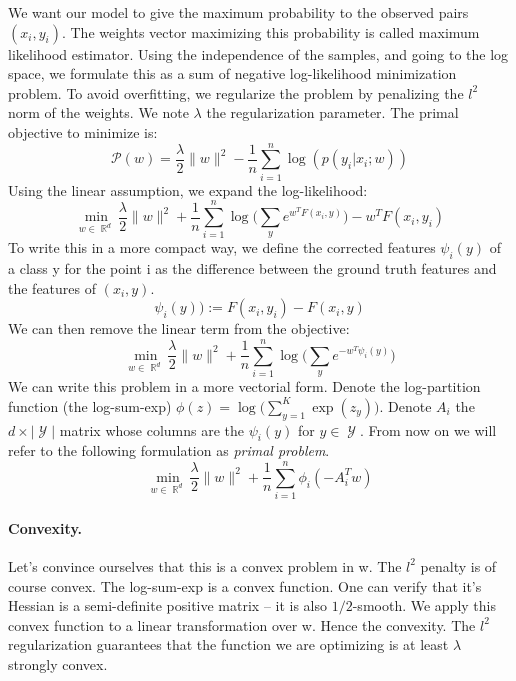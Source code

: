 \documentclass{article}
\DeclareMathOperator{\R}{\mathbb{R}}
\DeclareMathOperator{\1}{\mathbb{1}}
\DeclareMathOperator{\Y}{\mathcal{Y}}
\begin{document}
We want our model to give the maximum probability to the observed pairs $(x_i, y_i)$.
The weights vector maximizing this probability is called maximum likelihood estimator.
Using the independence of the samples, and going to the log space, we formulate this as a sum of negative log-likelihood minimization problem.
To avoid overfitting, we regularize the problem by penalizing the $l^2$ norm of the weights.
We note $\lambda$ the regularization parameter. The primal objective to minimize is:
\begin{equation*}
\mathscr P(w) = \frac{\lambda}{2}\|w\|^2 - \frac{1}{n}   \sum_{i=1}^{n} \log(p(y_i|x_i; w))	
\end{equation*}
Using the linear assumption, we expand the log-likelihood:
\begin{equation*}
	\min_{w\in\R^d} \frac{\lambda}{2}\|w\|^2 + \frac{1}{n}   \sum_{i=1}^{n}  \log \big (\sum_y e^{w^TF(x_i, y)} \big ) - w^TF(x_i, y_i)	
\end{equation*}
To write this in a more compact way, we define the corrected features $\psi_i(y)$ of a class y for the point i as the difference between the ground truth features and the features of $(x_i, y)$.
\begin{equation*}
	\psi_i(y)) := F(x_i, y_i) - F(x_i, y)
\end{equation*}
We can then remove the linear term from the objective:
\begin{equation*}
	\min_{w\in\R^d} \frac{\lambda}{2}\|w\|^2 + \frac{1}{n}   \sum_{i=1}^{n}  \log \big (\sum_y e^{- w^T\psi_i(y)} \big )
\end{equation*}
We can write this problem in a more vectorial form.
Denote the log-partition function (the log-sum-exp) $\phi(z) = \log \big(\sum_{y=1}^K \exp(z_y)\big)$. 
Denote $A_i$ the $d \times |\Y|$ matrix whose columns are the $\psi_i(y)$ for $y \in \Y$.
From now on we will refer to the following formulation as \textit{primal problem}.
\begin{equation}
	\label{primal problem}
	\min_{w\in\R^d}  \frac{\lambda}{2}\|w\|^2 + \frac{1}{n}   \sum_{i=1}^{n} \phi_i(-A_i^Tw)
\end{equation} 

\paragraph{Convexity.}
Let's convince ourselves that this is a convex problem in w.
The $l^2$ penalty is of course convex.
The log-sum-exp is a convex function.
One can verify that it's Hessian is a semi-definite positive matrix -- it is also $1/2$-smooth.
We apply this convex function to a linear transformation over w.
Hence the convexity.
The $l^2$ regularization guarantees that the function we are optimizing is at least $\lambda$ strongly convex. 
\end{document}
